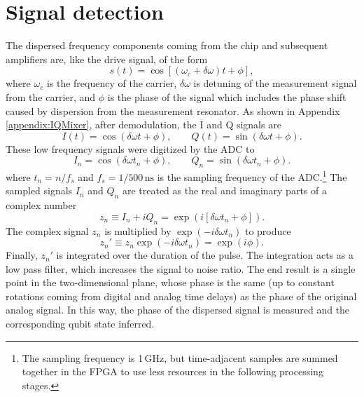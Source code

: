 \section{Signal detection} \label{signalDetection}

The dispersed frequency components coming from the chip and subsequent amplifiers are, like the drive signal, of the form \begin{equation}
s(t) = \cos \left[ \left(\omega_c + \delta \omega \right) t + \phi \right] , \end{equation}
where $\omega_c$ is the frequency of the carrier, $\delta \omega$ is detuning of the measurement signal from the carrier, and $\phi$ is the phase of the signal which includes the phase shift caused by dispersion from the measurement resonator.
As shown in Appendix \ref{appendix:IQMixer}, after demodulation, the I and Q signals are \begin{equation}
I(t) = \cos\left(\delta\omega t + \phi \right) , \qquad Q(t) = \sin\left(\delta\omega t + \phi \right) . \end{equation}
These low frequency signals were digitized by the ADC to \begin{equation}
I_n = \cos\left(\delta\omega t_n + \phi \right) , \qquad Q_n = \sin\left(\delta\omega t_n + \phi \right) . \end{equation}
where $t_n = n / f_s $ and $f_s = 1/500\,\text{ns}$ is the sampling frequency of the ADC.\footnote{The sampling frequency is 1\,GHz, but time-adjacent samples are summed together in the FPGA to use less resources in the following processing stages.}
The sampled signals $I_n$ and $Q_n$ are treated as the real and imaginary parts of a complex number \begin{equation}
z_n \equiv I_n + iQ_n = \exp \left( i \left[ \delta \omega t_n + \phi \right] \right). \end{equation}
The complex signal $z_n$ is multiplied by $\exp \left(-i \delta \omega t_n \right)$ to produce \begin{equation}
z_n' \equiv z_n \exp \left( -i\delta\omega t_n \right) = \exp\left( i\phi \right) . \end{equation}
Finally, $z_n'$ is integrated over the duration of the pulse.
The integration acts as a low pass filter, which increases the signal to noise ratio.
The end result is a single point in the two-dimensional plane, whose phase is the same (up to constant rotations coming from digital and analog time delays) as the phase of the original analog signal.
In this way, the phase of the dispersed signal is measured and the corresponding qubit state inferred.
